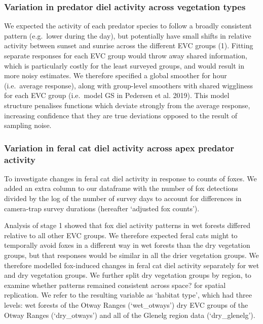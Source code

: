 \documentclass[]{elsarticle} %
\begin{document}
\hypertarget{variation-in-predator-diel-activity-across-vegetation-types}{%
\subsubsection{Variation in predator diel activity across vegetation types}\label{variation-in-predator-diel-activity-across-vegetation-types}}

We expected the activity of each predator species to follow a broadly consistent pattern (e.g.~lower during the day), but potentially have small shifts in relative activity between sunset and sunrise across the different EVC groups (1). Fitting separate responses for each EVC group would throw away shared information, which is particularly costly for the least surveyed groups, and would result in more noisy estimates. We therefore specified a global smoother for hour (i.e.~average response), along with group-level smoothers with shared wiggliness for each EVC group (i.e.~model GS in Pedersen et al. 2019). This model structure penalises functions which deviate strongly from the average response, increasing confidence that they are true deviations opposed to the result of sampling noise.

\hypertarget{variation-in-feral-cat-diel-activity-across-apex-predator-activity}{%
\subsubsection{Variation in feral cat diel activity across apex predator activity}\label{variation-in-feral-cat-diel-activity-across-apex-predator-activity}}

To investigate changes in feral cat diel activity in response to counts of foxes. We added an extra column to our dataframe with the number of fox detections divided by the log of the number of survey days to account for differences in camera-trap survey durations (hereafter `adjusted fox counts').

Analysis of stage 1 showed that fox diel activity patterns in wet forests differed relative to all other EVC groups. We therefore expected feral cats might to temporally avoid foxes in a different way in wet forests than the dry vegetation groups, but that responses would be similar in all the drier vegetation groups. We therefore modelled fox-induced changes in feral cat diel activity separately for wet and dry vegetation groups. We further split dry vegetation groups by region, to examine whether patterns remained consistent across space? for spatial replication. We refer to the resulting variable as `habitat type', which had three levels: wet forests of the Otway Ranges (`wet\_otways') dry EVC groups of the Otway Ranges (`dry\_otways') and all of the Glenelg region data (`dry\_glenelg').
\end{document}
